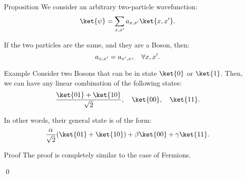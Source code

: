 \documentclass[a4paper]{article}
\begin{document}
%
%
%
%

\begin{parag}{Proposition}
    We consider an arbitrary two-particle wavefunction: 
    \[\ket{\psi} = \sum_{x, x'} a_{x, x'} \ket{x, x'}.\]

    If the two particles are the same, and they are a Boson, then: 
    \[a_{x, x'} = a_{x', x}, \quad \forall x, x'.\]

    \begin{subparag}{Example}
        Consider two Bosons that can be in state $\ket{0}$ or $\ket{1}$. Then, we can have any linear combination of the following states: 
        \[\frac{\ket{01} + \ket{10}}{\sqrt{2}}, \mathspace \ket{00}, \mathspace \ket{11}.\]

        In other words, their general state is of the form: 
        \[\frac{\alpha}{\sqrt{2}} \left(\ket{01} + \ket{10}\right) + \beta \ket{00} + \gamma \ket{11}.\]
    \end{subparag}

    \begin{subparag}{Proof}
        The proof is completely similar to the case of Fermions.

        \qed
    \end{subparag}
\end{parag}
\end{document}
